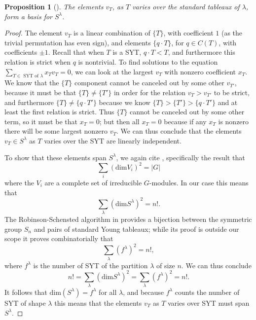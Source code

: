 \documentclass[12pt,twoside]{reedthesis}
\theoremstyle{plain}   %
\newtheorem{prop}{Proposition}[section]
\theoremstyle{definition}
\theoremstyle{remark}
\numberwithin{equation}{section}
\def\dim{\mathrm{dim}}
\begin{document}
  \begin{prop}[{\cite[Pg. 88]{fulton}}]\label{prop1}
    The elements $v_T$, as $T$ varies over the \emph{standard} tableaux of $\lambda$, form a basis for $S^\lambda$.
  \end{prop}
  \begin{proof}
    The element $v_T$ is a linear combination of $\{T\}$, with coefficient $1$ (as the trivial permutation has even sign),
    and elements $\{q \cdot T\}$, for $q \in C(T)$, with coefficients $\pm 1$.
    Recall that when $T$ is a SYT, $q \cdot T < T$, and furthermore this relation is strict when $q$ is nontrivial.
    To find solutions to the equation $\sum_{T \in \text{ SYT of $\lambda$}} x_Tv_T = 0$,
    we can look at the largest $v_T$ with nonzero coefficient $x_T$.
    We know that the $\{T\}$ component cannot be canceled out by some other $v_{T'}$, because it must be that $\{T\} \neq \{T'\}$ in
    order for the relation $v_T > v_{T'}$ to be strict,
    and furthermore $\{T\} \neq \{q \cdot T'\}$ because we know $\{ T\} > \{T'\} > \{q \cdot T'\}$ and at least the first relation is strict.
    Thus $\{T\}$ cannot be canceled out by some other term, so it must be that $x_T = 0$; but then all $x_T = 0$ because
    if any $x_T$ is nonzero there will be some largest nonzero $v_T$.
    We can thus conclude that the elements $v_T \in S^\lambda$ as $T$ varies over the SYT are linearly independent. \par
    To show that these elements span $S^\lambda$, we again cite \cite[Proposition 1.10.1]{sagan}, specifically the result
    that
    \[ \sum_i (\dim V_i)^2 =|G| \]
    where the $V_i$ are a complete set of irreducible $G$-modules.
    In our case this means that
    \[\sum_\lambda (\dim S^\lambda)^2 = n!.\]
    The Robinson-Schensted algorithm in \cite[Theorem 3.1.1]{sagan} provides a bijection between the symmetric group $S_n$ and pairs of standard Young tableaux;
    while its proof is outside our scope it proves combinatorially that
    \[ \sum_\lambda(f^\lambda)^2 = n!,\]
    where $f^\lambda$ is the number of SYT of the partition $\lambda$ of size $n$.
    We can thus conclude
    \[ n! = \sum_\lambda (\dim S^\lambda)^2 = \sum_\lambda(f^\lambda)^2 = n!.\]
    It follows that $\dim(S^\lambda) = f^\lambda$ for all $\lambda$, and because $f^\lambda$ counts the number of SYT of shape $\lambda$
    this means that the elements $v_T$ as $T$ varies over SYT must span $S^\lambda$.
  \end{proof}
\end{document}

